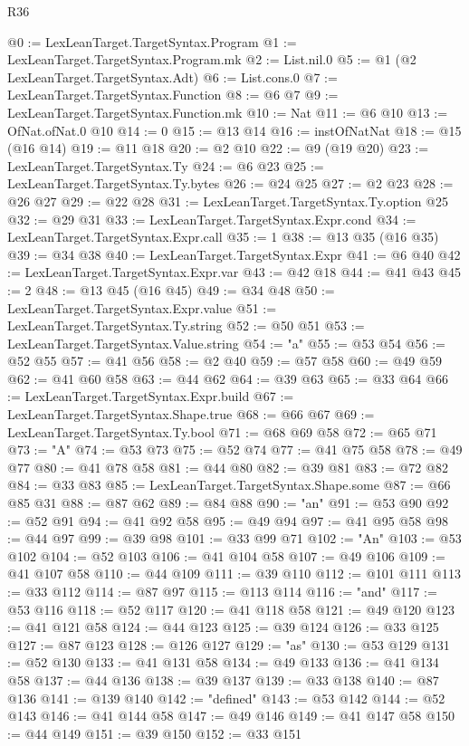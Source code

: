 \begin{lexlean}{R36}
\begin{coremodule}
@0 := LexLeanTarget.TargetSyntax.Program
@1 := LexLeanTarget.TargetSyntax.Program.mk
@2 := List.nil.{0}
@5 := @1 (@2 LexLeanTarget.TargetSyntax.Adt)
@6 := List.cons.{0}
@7 := LexLeanTarget.TargetSyntax.Function
@8 := @6 @7
@9 := LexLeanTarget.TargetSyntax.Function.mk
@10 := Nat
@11 := @6 @10
@13 := OfNat.ofNat.{0} @10
@14 := 0
@15 := @13 @14
@16 := instOfNatNat
@18 := @15 (@16 @14)
@19 := @11 @18
@20 := @2 @10
@22 := @9 (@19 @20)
@23 := LexLeanTarget.TargetSyntax.Ty
@24 := @6 @23
@25 := LexLeanTarget.TargetSyntax.Ty.bytes
@26 := @24 @25
@27 := @2 @23
@28 := @26 @27
@29 := @22 @28
@31 := LexLeanTarget.TargetSyntax.Ty.option @25
@32 := @29 @31
@33 := LexLeanTarget.TargetSyntax.Expr.cond
@34 := LexLeanTarget.TargetSyntax.Expr.call
@35 := 1
@38 := @13 @35 (@16 @35)
@39 := @34 @38
@40 := LexLeanTarget.TargetSyntax.Expr
@41 := @6 @40
@42 := LexLeanTarget.TargetSyntax.Expr.var
@43 := @42 @18
@44 := @41 @43
@45 := 2
@48 := @13 @45 (@16 @45)
@49 := @34 @48
@50 := LexLeanTarget.TargetSyntax.Expr.value
@51 := LexLeanTarget.TargetSyntax.Ty.string
@52 := @50 @51
@53 := LexLeanTarget.TargetSyntax.Value.string
@54 := "a"
@55 := @53 @54
@56 := @52 @55
@57 := @41 @56
@58 := @2 @40
@59 := @57 @58
@60 := @49 @59
@62 := @41 @60 @58
@63 := @44 @62
@64 := @39 @63
@65 := @33 @64
@66 := LexLeanTarget.TargetSyntax.Expr.build
@67 := LexLeanTarget.TargetSyntax.Shape.true
@68 := @66 @67
@69 := LexLeanTarget.TargetSyntax.Ty.bool
@71 := @68 @69 @58
@72 := @65 @71
@73 := "A"
@74 := @53 @73
@75 := @52 @74
@77 := @41 @75 @58
@78 := @49 @77
@80 := @41 @78 @58
@81 := @44 @80
@82 := @39 @81
@83 := @72 @82
@84 := @33 @83
@85 := LexLeanTarget.TargetSyntax.Shape.some
@87 := @66 @85 @31
@88 := @87 @62
@89 := @84 @88
@90 := "an"
@91 := @53 @90
@92 := @52 @91
@94 := @41 @92 @58
@95 := @49 @94
@97 := @41 @95 @58
@98 := @44 @97
@99 := @39 @98
@101 := @33 @99 @71
@102 := "An"
@103 := @53 @102
@104 := @52 @103
@106 := @41 @104 @58
@107 := @49 @106
@109 := @41 @107 @58
@110 := @44 @109
@111 := @39 @110
@112 := @101 @111
@113 := @33 @112
@114 := @87 @97
@115 := @113 @114
@116 := "and"
@117 := @53 @116
@118 := @52 @117
@120 := @41 @118 @58
@121 := @49 @120
@123 := @41 @121 @58
@124 := @44 @123
@125 := @39 @124
@126 := @33 @125
@127 := @87 @123
@128 := @126 @127
@129 := "as"
@130 := @53 @129
@131 := @52 @130
@133 := @41 @131 @58
@134 := @49 @133
@136 := @41 @134 @58
@137 := @44 @136
@138 := @39 @137
@139 := @33 @138
@140 := @87 @136
@141 := @139 @140
@142 := "defined"
@143 := @53 @142
@144 := @52 @143
@146 := @41 @144 @58
@147 := @49 @146
@149 := @41 @147 @58
@150 := @44 @149
@151 := @39 @150
@152 := @33 @151

\end{coremodule}
\end{lexlean}
